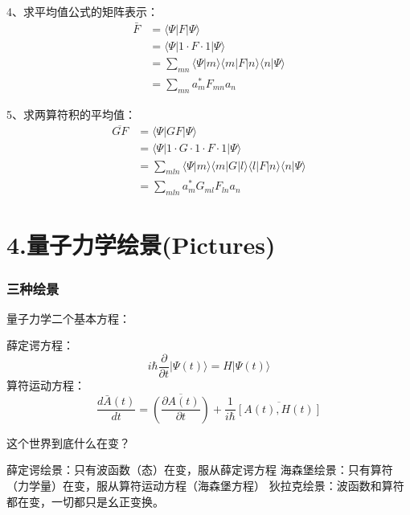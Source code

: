 \begin{frame} 
    4、求平均值公式的矩阵表示： 
    $$ \begin{aligned}
    \bar{F} &= \langle \Psi |F |\Psi \rangle  \\
    &= \langle \Psi |1 \cdot F \cdot 1 |\Psi \rangle  \\
    &= \sum_{mn} \langle \Psi |m\rangle\langle m |F| n\rangle\langle n |\Psi \rangle  \\
    &= \sum_{mn} a_m ^* F_{mn} a_n 
    \end{aligned}
    $$
\end{frame} 

\begin{frame} 
    5、求两算符积的平均值： 
    $$ \begin{aligned}
    \overline{GF} &= \langle \Psi |GF |\Psi \rangle  \\
    &= \langle \Psi |1 \cdot G \cdot 1 \cdot F \cdot 1 |\Psi \rangle  \\
    &= \sum_{mln} \langle \Psi |m\rangle\langle m |G |l\rangle\langle l| F| n\rangle\langle n |\Psi \rangle  \\
    &= \sum_{mln} a_m ^* G_{ml} F_{ln} a_n 
    \end{aligned}
    $$
\end{frame} 

\section{4.量子力学绘景(Pictures)}

\begin{frame}  
    \frametitle{三种绘景}
    量子力学二个基本方程：  
    \begin{enumerate}
        \Item 薛定谔方程：$$ i\hbar \frac{\partial }{\partial t} |\Psi(t)\rangle = H|\Psi(t)\rangle $$
        \Item 算符运动方程：$$ \frac{d\bar{A}(t)}{dt}=\overline{(\frac{\partial A(t) }{\partial t})}  +\frac{1}{i\hbar} \overline{[A(t),H(t)]}$$
    \end{enumerate}
    这个世界到底什么在变？\\
    \begin{itemize}
        \done 薛定谔绘景：只有波函数（态）在变，服从薛定谔方程
        \done 海森堡绘景：只有算符（力学量）在变，服从算符运动方程（海森堡方程）
        \done 狄拉克绘景：波函数和算符都在变，一切都只是幺正变换。
    \end{itemize}
\end{frame} 

